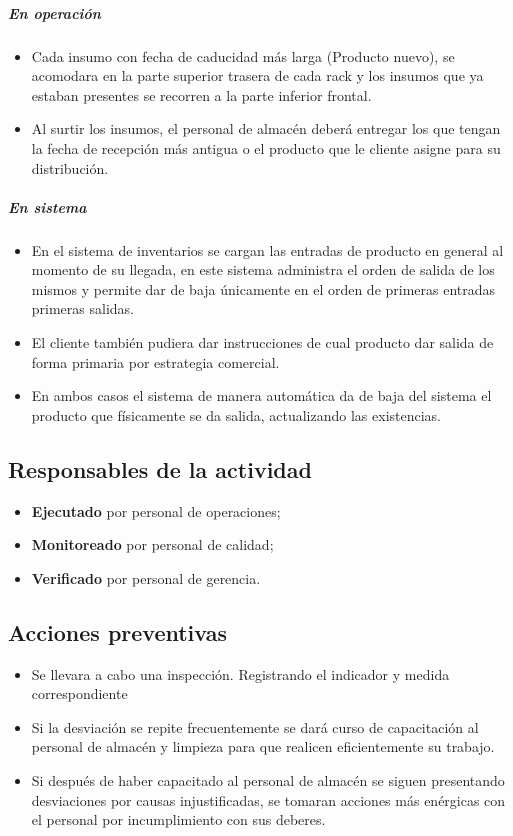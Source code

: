 \subparagraph{En operación}

\begin{itemize}
	\item Cada insumo con fecha de caducidad más larga (Producto nuevo), se acomodara en la parte superior trasera de cada rack y los insumos que ya estaban presentes se recorren a la parte inferior frontal.
	\item Al surtir los insumos, el personal de almacén deberá entregar los que tengan la fecha de recepción más antigua o el producto que le cliente asigne para su distribución.
\end{itemize}

\subparagraph{En sistema}

\begin{itemize}
	\item En el sistema de inventarios se cargan las entradas de producto en general al momento de su llegada, en este sistema administra el orden de salida de los mismos y permite dar de baja únicamente en el orden de primeras entradas primeras salidas.
	\item El cliente también pudiera dar instrucciones de cual producto dar salida de forma primaria por estrategia comercial.
	\item En ambos casos el sistema de manera automática da de baja del sistema el producto que físicamente se da salida, actualizando las existencias.
\end{itemize}

\subsection{Responsables de la actividad}

\begin{itemize}
	\item \textbf{Ejecutado} por personal de operaciones;
	\item \textbf{Monitoreado} por personal de calidad;
	\item \textbf{Verificado} por personal de gerencia.
\end{itemize}

\subsection{Acciones preventivas}

\begin{itemize}
	\item Se llevara a cabo una inspección. Registrando el indicador y medida correspondiente
	\item Si la desviación se repite frecuentemente se dará curso de capacitación al personal de almacén y limpieza para que realicen eficientemente su trabajo.
	\item Si después de haber capacitado al personal de almacén se siguen presentando desviaciones por causas injustificadas, se tomaran acciones más enérgicas con el personal por incumplimiento con sus deberes.
\end{itemize}

